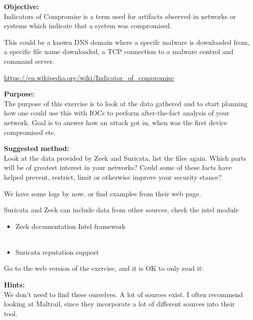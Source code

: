 \documentclass[a4paper,11pt,notitlepage]{report}
\begin{document}
{\bf Objective:} \\
Indicators of Compromise is a term used for artifacts observed in networks or systems which indicate that a system was compromised.

This could be a known DNS domain where a specifc malware is downloaded from, a specific file name downloaded, a TCP connection to a malware control and command server.

\url{https://en.wikipedia.org/wiki/Indicator_of_compromise}

{\bf Purpose:}\\
The purpose of this exercise is to look at the data gathered and to start planning how one could use this with IOCs to perform after-the-fact analysis of your network. Goal is to answer how an attack got in, when was the first device compromised etc.


{\bf Suggested method:}\\
Look at the data provided by Zeek and Suricata, list the files again.
Which parts will be of greatest interest in your networks? Could some of these facts have helped prevent, restrict, limit or otherwise improve your security stance?

We have some logs by now, or find examples from their web page.

Suricata and Zeek can include data from other sources, check the intel module\\

\begin{itemize}
\item Zeek documentation Intel framework\\
\\
\item Suricata reputation support\\
\end{itemize}

Go to the web version of the exercise, and it is OK to only read it:\\


{\bf Hints:}\\
We don't need to find these ourselves. A lot of sources exist. I often recommend looking at Maltrail, since they incorporate a lot of different sources into their tool.
\end{document}

